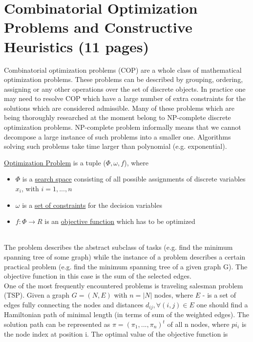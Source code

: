 \section{Combinatorial Optimization Problems and Constructive
Heuristics (11 pages)}

Combinatorial optimization problems (COP) are a whole class of mathematical optimization problems. These problems can be described by grouping, ordering, assigning or any other operations over the set of discrete objects. In practice one may need to resolve COP which have a large number of extra constraints for the solutions which are considered admissible. Many of these problems which are being thoroughly researched at the moment belong to NP-complete discrete optimization problems. NP-complete problem informally means that we cannot decompose a large instance of such problems into a smaller one. Algorithms solving such problems take time larger than polynomial (e.g. exponential).

\begin{minipage}[c, breaklines=true]{0.95\textwidth}
\begin{definition}
	\underline{Optimization Problem} is a tuple ($\Phi,\omega, f$), where
	\begin{itemize}
		\item{$\Phi$ is a \underline{search space} consisting of all possible assignments of discrete variables $x_i$, with $i=1,...,n$ }
		\item{$\omega$ is a \underline{set of constraints} for the decision variables}
		\item{$f:\Phi \to R$ is an \underline{objective function} which has to be optimized}
	\end{itemize}
\end{definition}
\end{minipage} \\

The problem describes the abstract subclass of tasks (e.g. find the minimum spanning tree of some graph) while the instance of a problem describes a certain practical problem (e.g. find the minimum spanning tree of a given graph G). The objective function in this case is the sum of the selected edges. \\
One of the most frequently encountered problems is traveling salesman problem (TSP). Given a graph $G=(N,E)$ with $n=|N|$ nodes, where $E$ - is a set of edges fully connecting the nodes and distances $d_{ij}, \forall(i,j) \in E$ one should find a Hamiltonian path of minimal length (in terms of sum of the weighted edges). The solution path can be represented as $\pi=(\pi_1,...,\pi_n)^t$ of all n nodes, where $pi_i$ is the node index at position i. The optimal value of the objective function is

